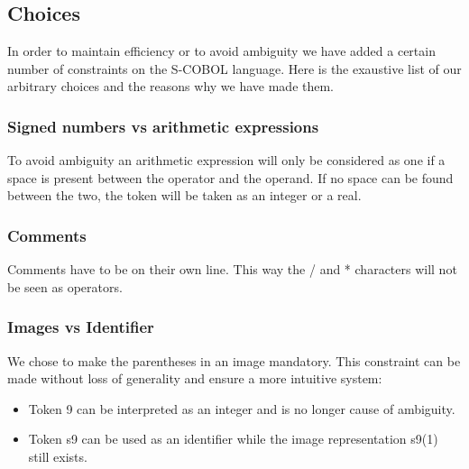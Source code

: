 \subsection{Choices}

In order to maintain efficiency or to avoid ambiguity we have added a certain number of constraints on the S-COBOL language. Here is the exaustive list of our arbitrary choices and the reasons why we have made them.

\subsubsection{Signed numbers vs arithmetic expressions}

To avoid ambiguity an arithmetic expression will only be considered as one if a space is present between the operator and the operand. If no space can be found between the two, the token will be taken as an integer or a real.

\subsubsection{Comments}

Comments have to be on their own line. This way the / and * characters will not be seen as operators.

\subsubsection{Images vs Identifier}

We chose to make the parentheses in an image mandatory. This constraint can be made without loss of generality and ensure a more intuitive system:

\begin{itemize}
	\item Token 9 can be interpreted as an integer and is no longer cause of ambiguity.
	\item Token s9 can be used as an identifier while the image representation s9(1) still exists.  
	
\end{itemize}



